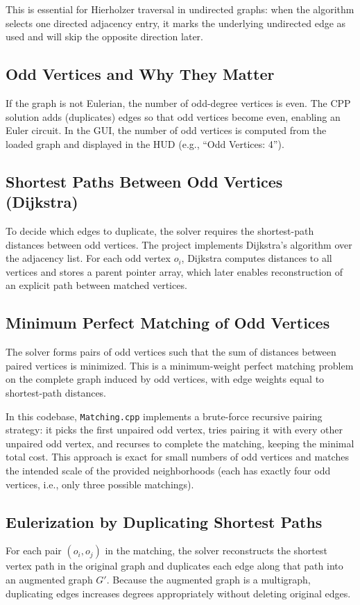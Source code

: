 \documentclass[conference]{IEEEtran}
\begin{document}
This is essential for Hierholzer traversal in undirected graphs: when the algorithm selects one directed adjacency entry, it marks the underlying undirected edge as used and will skip the opposite direction later.

\subsection{Odd Vertices and Why They Matter}
If the graph is not Eulerian, the number of odd-degree vertices is even.
The CPP solution adds (duplicates) edges so that odd vertices become even, enabling an Euler circuit.
In the GUI, the number of odd vertices is computed from the loaded graph and displayed in the HUD (e.g., ``Odd Vertices: 4'').

\subsection{Shortest Paths Between Odd Vertices (Dijkstra)}
To decide which edges to duplicate, the solver requires the shortest-path distances between odd vertices.
The project implements Dijkstra's algorithm over the adjacency list.
For each odd vertex $o_i$, Dijkstra computes distances to all vertices and stores a parent pointer array, which later enables reconstruction of an explicit path between matched vertices.

\subsection{Minimum Perfect Matching of Odd Vertices}
The solver forms pairs of odd vertices such that the sum of distances between paired vertices is minimized.
This is a minimum-weight perfect matching problem on the complete graph induced by odd vertices, with edge weights equal to shortest-path distances.

In this codebase, \texttt{Matching.cpp} implements a brute-force recursive pairing strategy:
it picks the first unpaired odd vertex, tries pairing it with every other unpaired odd vertex, and recurses to complete the matching, keeping the minimal total cost.
This approach is exact for small numbers of odd vertices and matches the intended scale of the provided neighborhoods (each has exactly four odd vertices, i.e., only three possible matchings).

\subsection{Eulerization by Duplicating Shortest Paths}
For each pair $(o_i,o_j)$ in the matching, the solver reconstructs the shortest vertex path in the original graph and duplicates each edge along that path into an augmented graph $G'$.
Because the augmented graph is a multigraph, duplicating edges increases degrees appropriately without deleting original edges.
\end{document}
